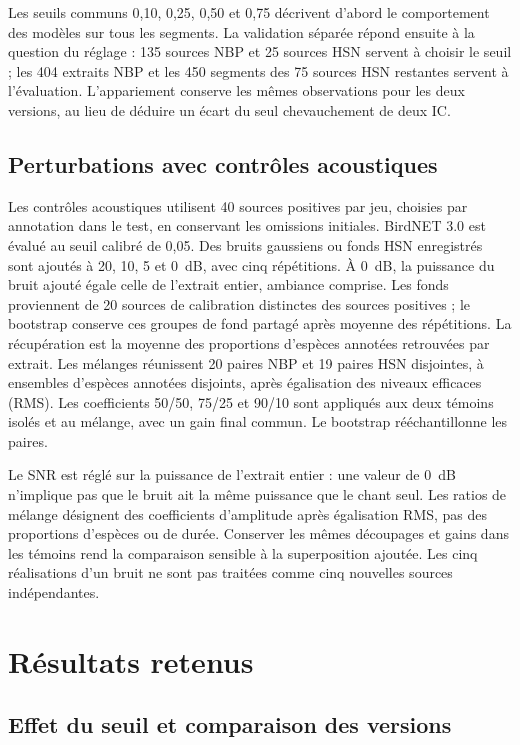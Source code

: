 \documentclass{technology_watch}
\begin{document}
Les seuils communs 0,10, 0,25, 0,50 et 0,75 décrivent d'abord le comportement
des modèles sur tous les segments. La validation séparée répond ensuite à la
question du réglage : 135 sources NBP et 25 sources HSN servent à choisir le
seuil ; les 404 extraits NBP et les 450 segments des 75 sources HSN restantes
servent à l'évaluation. L'appariement conserve les mêmes observations pour les
deux versions, au lieu de déduire un écart du seul chevauchement de deux IC.

\subsection{Perturbations avec contrôles acoustiques}

Les contrôles acoustiques utilisent 40 sources positives par jeu, choisies par
annotation dans le test, en conservant les omissions initiales. BirdNET 3.0
est évalué au seuil calibré de 0,05. Des bruits gaussiens ou fonds HSN enregistrés
sont ajoutés à 20, 10, 5 et 0~dB, avec cinq répétitions. À 0~dB, la puissance
du bruit ajouté égale celle de l'extrait entier, ambiance comprise. Les fonds
proviennent de 20 sources de calibration distinctes des sources positives ;
le bootstrap conserve ces groupes de fond partagé après moyenne des répétitions.
La récupération est la moyenne des proportions d'espèces annotées retrouvées
par extrait. Les mélanges réunissent 20 paires NBP et 19 paires HSN disjointes,
à ensembles d'espèces annotées disjoints, après égalisation des niveaux efficaces (RMS).
Les coefficients 50/50, 75/25 et 90/10 sont appliqués aux deux témoins isolés
et au mélange, avec un gain final commun. Le bootstrap rééchantillonne les paires.

Le SNR est réglé sur la puissance de l'extrait entier : une valeur de 0~dB
n'implique pas que le bruit ait la même puissance que le chant seul. Les ratios
de mélange désignent des coefficients d'amplitude après égalisation RMS,
pas des proportions d'espèces ou de durée. Conserver les mêmes découpages et
gains dans les témoins rend la comparaison sensible à la superposition ajoutée.
Les cinq réalisations d'un bruit ne sont pas traitées comme cinq nouvelles
sources indépendantes.

\section{Résultats retenus}

\subsection{Effet du seuil et comparaison des versions}
\end{document}
